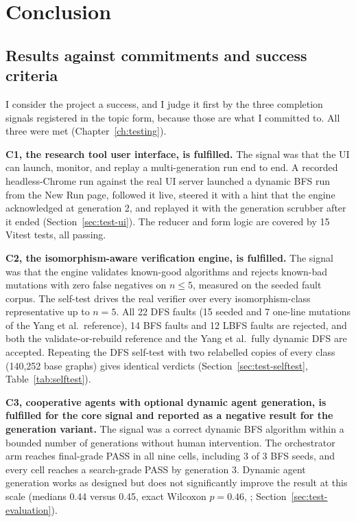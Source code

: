 \chapter{Conclusion}
\label{ch:conclusion}

\section{Results against commitments and success criteria}

I consider the project a success, and I judge it first by the three completion
signals registered in the topic form, because those are what I committed to.
All three were met (Chapter~\ref{ch:testing}).

\textbf{C1, the research tool user interface, is fulfilled.} The signal was that
the UI can launch, monitor, and replay a multi-generation run end to end. A
recorded headless-Chrome run against the real UI server launched a dynamic BFS
run from the New Run page, followed it live, steered it with a hint that the
engine acknowledged at generation 2, and replayed it with the generation
scrubber after it ended (Section~\ref{sec:test-ui}). The reducer and form logic
are covered by 15 Vitest tests, all passing.

\textbf{C2, the isomorphism-aware verification engine, is fulfilled.} The signal
was that the engine validates known-good algorithms and rejects known-bad
mutations with zero false negatives on $n \le 5$, measured on the seeded fault
corpus. The self-test drives the real verifier over every isomorphism-class
representative up to $n = 5$. All 22 DFS faults (15 seeded and 7 one-line
mutations of the Yang et al.\ reference), 14 BFS faults and 12 LBFS faults are
rejected, and both the validate-or-rebuild reference and the Yang et al.\ fully
dynamic DFS are accepted. Repeating the DFS self-test with two relabelled copies
of every class (140{,}252 base graphs) gives identical verdicts
(Section~\ref{sec:test-selftest}, Table~\ref{tab:selftest}).

\textbf{C3, cooperative agents with optional dynamic agent generation, is
fulfilled for the core signal and reported as a negative result for the
generation variant.} The signal was a correct dynamic BFS algorithm within a
bounded number of generations without human intervention. The orchestrator arm
reaches final-grade PASS in all nine cells, including 3 of 3 BFS seeds, and
every cell reaches a search-grade PASS by generation 3. Dynamic agent generation
works as designed but does not significantly improve the result at this scale
(medians 0.44 versus 0.45, exact Wilcoxon $p = 0.46$,
\citealp{wilcoxon1945}; Section~\ref{sec:test-evaluation}).

